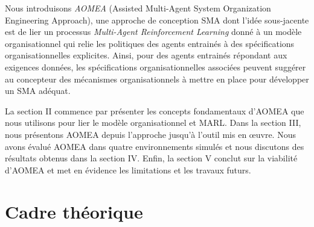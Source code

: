 \documentclass[contribution]{jfsma}
\begin{document}
Nous introduisons \emph{AOMEA} (Assisted Multi-Agent System Organization Engineering Approach), une approche de conception SMA dont l'idée sous-jacente est de lier un processus \emph{Multi-Agent Reinforcement Learning} donné à un modèle organisationnel qui relie les politiques des agents entrainés à des spécifications organisationnelles explicites. Ainsi, pour des agents entrainés répondant aux exigences données, les spécifications organisationnelles associées peuvent suggérer au concepteur des mécanismes organisationnels à mettre en place pour développer un SMA adéquat.%



La section II commence par présenter les concepts fondamentaux d'AOMEA que nous utilisons pour lier le modèle organisationnel et MARL.
Dans la section III, nous présentons AOMEA depuis l’approche jusqu’à l’outil mis en œuvre. Nous avons évalué AOMEA dans quatre environnements simulés et nous discutons des résultats obtenus dans la section IV. Enfin, la section V conclut sur la viabilité d'AOMEA et met en évidence les limitations et les travaux futurs.


\section{Cadre théorique}
\end{document}
